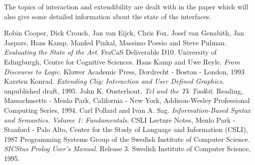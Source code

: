 The topics of interaction and extendibility are dealt with in the paper
\cite{Konrad 95b} which will also give some detailed information about
the state of the interfaces.
  
\newpage
\begin{thebibliography}{kako}
        Robin Cooper, Dick Crouch, Jan van Eijck, Chris Fox,
        Josef van Genabith, Jan Jaspars, Hans Kamp,
        Manfed Pinkal, Massimo Poesio and Steve Pulman.
        {\em Evaluating the State of the Art}. FraCaS Deliverable D10.
        University of Edingburgh, Centre for Cognitive Sciences. 
    Hans Kamp and Uwe Reyle.
        {\em From Discourse to Logic}.  Kluwer Academic Press,
        Dordrecht - Boston - London, 1993 
    Karsten Konrad. {\em Extending {\sc Clig}:
           Interaction and User Defined Graphics}. 
           unpublished draft, 1995.
    John K. Ousterhout. {\em Tcl
           and the Tk Toolkit\/}.  Reading, Massachusetts - Menlo Park,
           California - New York, Addison-Wesley Professional Computing
           Series, 1994.  
    Carl Pollard
           and Ivan A. Sag. {\em Information-Based Syntax and
           Semantics. Volume 1: Fundamentals}. CSLI Lecture Notes,
           Menlo Park - Stanford - Palo Alto, Center for the Study of 
           Language and Information (CSLI), 1987
    Programming Systems Group of the
           Swedish Institute of Computer Science. {\em SICStus Prolog
           User's Manual}. Release 3. Swedish Institute of Computer 
           Science, 1995.
\end{thebibliography}

 
